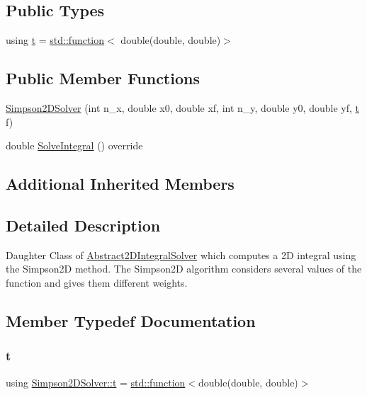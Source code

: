 \subsection*{Public Types}
\begin{DoxyCompactItemize}
\item 
using \hyperlink{class_simpson2_d_solver_a0267d4b1dec3215e954667b1699e687f}{t} = \hyperlink{_tests_8cpp_a1c2dbde1ba7d93e381d4ccb9f603be16}{std\+::function}$<$ double(double, double)$>$
\end{DoxyCompactItemize}
\subsection*{Public Member Functions}
\begin{DoxyCompactItemize}
\item 
\hyperlink{class_simpson2_d_solver_a16ade6b2b5e89031c452f11e70c2f8fb}{Simpson2\+D\+Solver} (int n\+\_\+x, double x0, double xf, int n\+\_\+y, double y0, double yf, \hyperlink{class_abstract2_d_integral_solver_ab660df32953c6b0f9f3a45a8720eaeb3}{t} f)
\item 
double \hyperlink{class_simpson2_d_solver_a3fc19037fef83ad05381138d9f7da939}{Solve\+Integral} () override
\end{DoxyCompactItemize}
\subsection*{Additional Inherited Members}


\subsection{Detailed Description}
Daughter Class of \hyperlink{class_abstract2_d_integral_solver}{Abstract2\+D\+Integral\+Solver} which computes a 2D integral using the Simpson2D method. The Simpson2D algorithm considers several values of the function and gives them different weights. 

\subsection{Member Typedef Documentation}
\mbox{\label{class_simpson2_d_solver_a0267d4b1dec3215e954667b1699e687f}} 
\subsubsection{\texorpdfstring{t}{t}}
{\footnotesize\ttfamily using \hyperlink{class_simpson2_d_solver_a0267d4b1dec3215e954667b1699e687f}{Simpson2\+D\+Solver\+::t} =  \hyperlink{_tests_8cpp_a1c2dbde1ba7d93e381d4ccb9f603be16}{std\+::function}$<$double(double, double)$>$}

